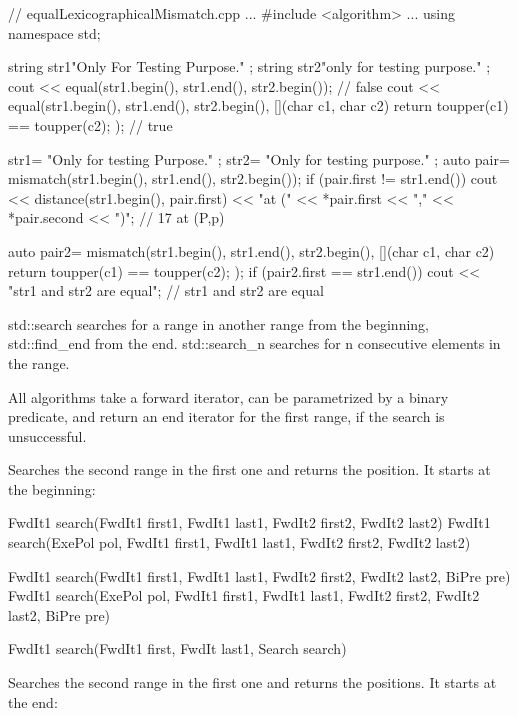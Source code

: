 
\begin{cpp}
// equalLexicographicalMismatch.cpp
...
#include <algorithm>
...
using namespace std;

string str1{"Only For Testing Purpose." };
string str2{"only for testing purpose." };
cout << equal(str1.begin(), str1.end(), str2.begin()); // false
cout << equal(str1.begin(), str1.end(), str2.begin(),
			  [](char c1, char c2){ return toupper(c1) == toupper(c2);} );
																// true

str1= {"Only for testing Purpose." };
str2= {"Only for testing purpose." };
auto pair= mismatch(str1.begin(), str1.end(), str2.begin());
if (pair.first != str1.end()){
	cout << distance(str1.begin(), pair.first)
		 << "at (" << *pair.first << "," << *pair.second << ")"; // 17 at (P,p)
}

auto pair2= mismatch(str1.begin(), str1.end(), str2.begin(),
					 [](char c1, char c2){ return toupper(c1) == toupper(c2); });
if (pair2.first == str1.end()){
	cout << "str1 and str2 are equal"; // str1 and str2 are equal
}
\end{cpp}


std::search searches for a range in another range from the beginning, std::find\_end from the end. std::search\_n searches for n consecutive elements in the range.

All algorithms take a forward iterator, can be parametrized by a binary predicate, and return an end iterator for the first range, if the search is unsuccessful.

Searches the second range in the first one and returns the position. It starts at the beginning:

\begin{cpp}
FwdIt1 search(FwdIt1 first1, FwdIt1 last1, FwdIt2 first2, FwdIt2 last2)
FwdIt1 search(ExePol pol, FwdIt1 first1, FwdIt1 last1,
			  FwdIt2 first2, FwdIt2 last2)
			  
FwdIt1 search(FwdIt1 first1, FwdIt1 last1,
			  FwdIt2 first2, FwdIt2 last2, BiPre pre)
FwdIt1 search(ExePol pol, FwdIt1 first1, FwdIt1 last1,
			  FwdIt2 first2, FwdIt2 last2, BiPre pre)
			  
FwdIt1 search(FwdIt1 first, FwdIt last1, Search search)
\end{cpp}

Searches the second range in the first one and returns the positions. It starts at the end:

